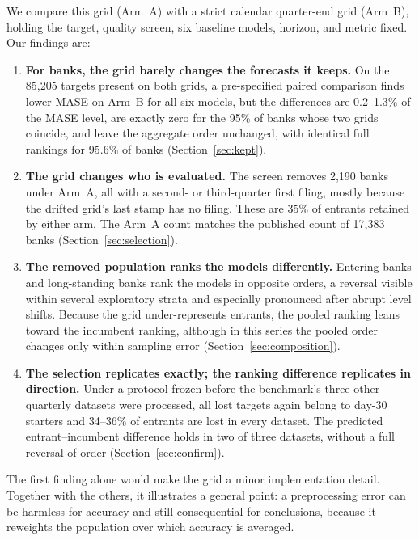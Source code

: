 \documentclass[11pt]{article}
\begin{document}
We compare this grid (Arm~A) with a strict calendar quarter-end grid (Arm~B), holding the target, quality screen, six baseline models, horizon, and metric fixed. Our findings are:
\begin{enumerate}
  \item \textbf{For banks, the grid barely changes the forecasts it keeps.} On the 85,205 targets present on both grids, a pre-specified paired comparison finds lower MASE on Arm~B for all six models, but the differences are 0.2--1.3\% of the MASE level, are exactly zero for the 95\% of banks whose two grids coincide, and leave the aggregate order unchanged, with identical full rankings for 95.6\% of banks (Section~\ref{sec:kept}).
  \item \textbf{The grid changes who is evaluated.} The screen removes 2,190 banks under Arm~A, all with a second- or third-quarter first filing, mostly because the drifted grid's last stamp has no filing. These are 35\% of entrants retained by either arm. The Arm~A count matches the published count of 17,383 banks (Section~\ref{sec:selection}).
  \item \textbf{The removed population ranks the models differently.} Entering banks and long-standing banks rank the models in opposite orders, a reversal visible within several exploratory strata and especially pronounced after abrupt level shifts. Because the grid under-represents entrants, the pooled ranking leans toward the incumbent ranking, although in this series the pooled order changes only within sampling error (Section~\ref{sec:composition}).
  \item \textbf{The selection replicates exactly; the ranking difference replicates in direction.} Under a protocol frozen before the benchmark's three other quarterly datasets were processed, all lost targets again belong to day-30 starters and 34--36\% of entrants are lost in every dataset. The predicted entrant--incumbent difference holds in two of three datasets, without a full reversal of order (Section~\ref{sec:confirm}).
\end{enumerate}
The first finding alone would make the grid a minor implementation detail. Together with the others, it illustrates a general point: a preprocessing error can be harmless for accuracy and still consequential for conclusions, because it reweights the population over which accuracy is averaged.
\end{document}
